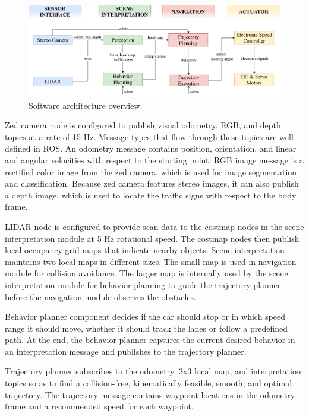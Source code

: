 \begin{figure}[h]
  \centering
  \includegraphics[width=.9\textwidth]{figures/software-architecture.pdf}
  \caption[Software architecture overview]{Software architecture overview.}
  \label{figure:software-architecture}
\end{figure}

Zed camera node is configured to publish visual odometry, RGB, and depth topics
at a rate of 15 Hz. Message types that flow through these topics are
well-defined in ROS. An odometry message contains position, orientation, and
linear and angular velocities with respect to the starting point. RGB image
message is a rectified color image from the zed camera, which is used for
image segmentation and classification. Because zed camera features stereo
images, it can also publish a depth image, which is used to locate the traffic
signs with respect to the body frame.

LIDAR node is configured to provide scan data to the costmap nodes in the scene
interpretation module at 5 Hz rotational speed. The costmap nodes then
publish local occupancy grid maps that indicate nearby objects. Scene
interpretation maintains two local maps in different sizes. The small map is
used in navigation module for collision avoidance. The larger map is
internally used by the scene interpretation module for behavior planning to
guide the trajectory planner before the navigation module observes the
obstacles.

Behavior planner component decides if the car should stop or in which speed
range it should move, whether it should track the lanes or follow a predefined
path. At the end, the behavior planner captures the current desired
behavior in an interpretation message and publishes to the trajectory planner.

Trajectory planner subscribes to the odometry, 3x3 local map, and
interpretation topics so as to find a collision-free, kinematically feasible,
smooth, and optimal trajectory. The trajectory message contains waypoint
locations in the odometry frame and a recommended speed for each waypoint.

